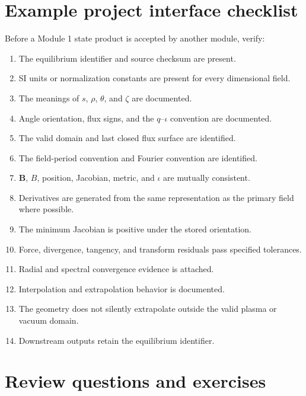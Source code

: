 \section{Example project interface checklist}
\label{app:interface_checklist}

Before a Module 1 state product is accepted by another module, verify:
\begin{enumerate}[leftmargin=1.6em]
\item The equilibrium identifier and source checksum are present.
\item SI units or normalization constants are present for every dimensional field.
\item The meanings of $s$, $\rho$, $\theta$, and $\zeta$ are documented.
\item Angle orientation, flux signs, and the $q$--$\iota$ convention are documented.
\item The valid domain and last closed flux surface are identified.
\item The field-period convention and Fourier convention are identified.
\item $\mathbf B$, $B$, position, Jacobian, metric, and $\iota$ are mutually consistent.
\item Derivatives are generated from the same representation as the primary field where possible.
\item The minimum Jacobian is positive under the stored orientation.
\item Force, divergence, tangency, and transform residuals pass specified tolerances.
\item Radial and spectral convergence evidence is attached.
\item Interpolation and extrapolation behavior is documented.
\item The geometry does not silently extrapolate outside the valid plasma or vacuum domain.
\item Downstream outputs retain the equilibrium identifier.
\end{enumerate}

\section{Review questions and exercises}
\label{app:exercises}

